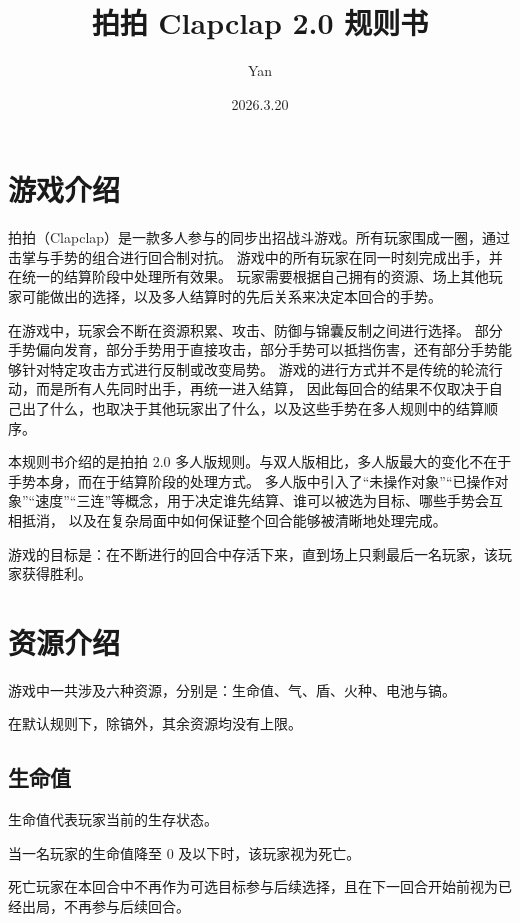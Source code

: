 \documentclass[12pt]{ctexart}
\author{Yan}
\title{拍拍 Clapclap 2.0 规则书}
\date{2026.3.20}
\begin{document}
\maketitle
\tableofcontents
\newpage

\section{游戏介绍}

拍拍（Clapclap）是一款多人参与的同步出招战斗游戏。所有玩家围成一圈，通过击掌与手势的组合进行回合制对抗。
游戏中的所有玩家在同一时刻完成出手，并在统一的结算阶段中处理所有效果。
玩家需要根据自己拥有的资源、场上其他玩家可能做出的选择，以及多人结算时的先后关系来决定本回合的手势。

在游戏中，玩家会不断在资源积累、攻击、防御与锦囊反制之间进行选择。
部分手势偏向发育，部分手势用于直接攻击，部分手势可以抵挡伤害，还有部分手势能够针对特定攻击方式进行反制或改变局势。
游戏的进行方式并不是传统的轮流行动，而是所有人先同时出手，再统一进入结算，
因此每回合的结果不仅取决于自己出了什么，也取决于其他玩家出了什么，以及这些手势在多人规则中的结算顺序。

本规则书介绍的是拍拍 2.0 多人版规则。与双人版相比，多人版最大的变化不在于手势本身，而在于结算阶段的处理方式。
多人版中引入了“未操作对象”“已操作对象”“速度”“三连”等概念，用于决定谁先结算、谁可以被选为目标、哪些手势会互相抵消，
以及在复杂局面中如何保证整个回合能够被清晰地处理完成。

游戏的目标是：在不断进行的回合中存活下来，直到场上只剩最后一名玩家，该玩家获得胜利。

\section{资源介绍}

游戏中一共涉及六种资源，分别是：生命值、气、盾、火种、电池与镐。

在默认规则下，除镐外，其余资源均没有上限。

\subsection{生命值}

生命值代表玩家当前的生存状态。

当一名玩家的生命值降至 0 及以下时，该玩家视为死亡。

死亡玩家在本回合中不再作为可选目标参与后续选择，且在下一回合开始前视为已经出局，不再参与后续回合。
\end{document}
